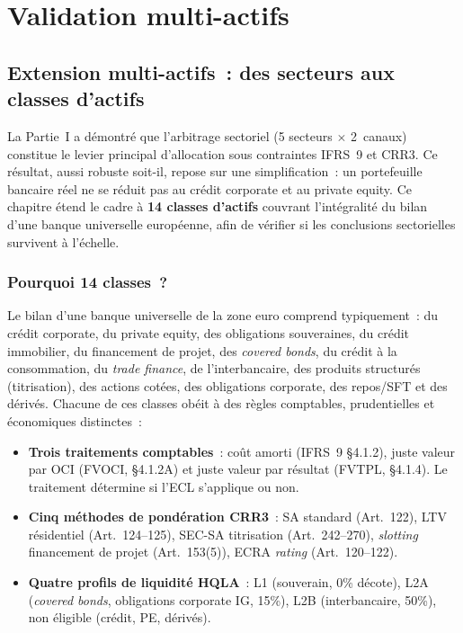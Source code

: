 \documentclass[12pt, a4paper, twoside, openright]{report}
\theoremstyle{definition}
\begin{document}
\part{Validation multi-actifs}
\label{part:validation}

\chapter{Extension multi-actifs~: des secteurs aux classes d'actifs}
\label{chap:multi-actifs}

La Partie~I a démontré que l'arbitrage sectoriel (5 secteurs $\times$ 2~canaux) constitue le levier principal d'allocation sous contraintes IFRS~9 et CRR3. Ce résultat, aussi robuste soit-il, repose sur une simplification~: un portefeuille bancaire réel ne se réduit pas au crédit corporate et au private equity. Ce chapitre étend le cadre à \textbf{14 classes d'actifs} couvrant l'intégralité du bilan d'une banque universelle européenne, afin de vérifier si les conclusions sectorielles survivent à l'échelle.

\section{Pourquoi 14 classes~?}
\label{sec:multi-pourquoi}

Le bilan d'une banque universelle de la zone euro comprend typiquement~: du crédit corporate, du private equity, des obligations souveraines, du crédit immobilier, du financement de projet, des \textit{covered bonds}, du crédit à la consommation, du \textit{trade finance}, de l'interbancaire, des produits structurés (titrisation), des actions cotées, des obligations corporate, des repos/SFT et des dérivés. Chacune de ces classes obéit à des règles comptables, prudentielles et économiques distinctes~:

\begin{itemize}
\item \textbf{Trois traitements comptables}~: coût amorti (IFRS~9 §4.1.2), juste valeur par OCI (FVOCI, §4.1.2A) et juste valeur par résultat (FVTPL, §4.1.4). Le traitement détermine si l'ECL s'applique ou non.
\item \textbf{Cinq méthodes de pondération CRR3}~: SA standard (Art.~122), LTV résidentiel (Art.~124--125), SEC-SA titrisation (Art.~242--270), \textit{slotting} financement de projet (Art.~153(5)), ECRA \textit{rating} (Art.~120--122).
\item \textbf{Quatre profils de liquidité HQLA}~: L1 (souverain, 0\% décote), L2A (\textit{covered bonds}, obligations corporate IG, 15\%), L2B (interbancaire, 50\%), non éligible (crédit, PE, dérivés).
\end{itemize}
\end{document}
